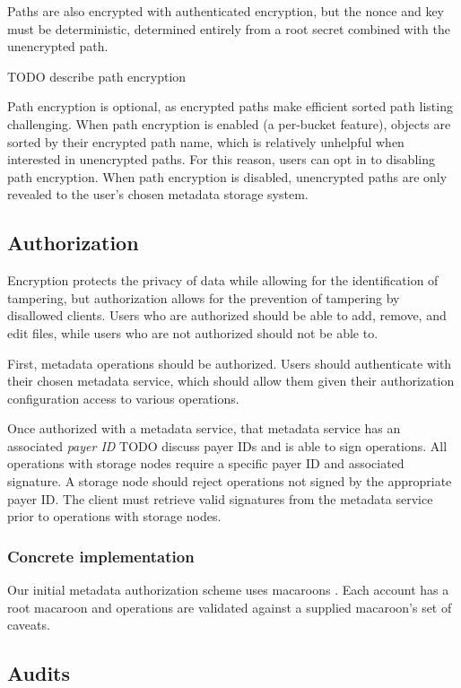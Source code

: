 \documentclass[a4paper,10pt]{article} \usepackage[utf8]{inputenc}
\newcommand{\todo}[1]{{\color{red} TODO #1}}
\begin{document}
Paths are also encrypted with authenticated encryption, but the nonce and key
must be deterministic, determined entirely from a root secret combined with the
unencrypted path.

\todo{describe path encryption}

Path encryption is optional, as encrypted paths make efficient sorted path
listing challenging. When path encryption is enabled (a per-bucket feature),
objects are sorted by their encrypted path name, which is relatively unhelpful
when interested in unencrypted paths. For this reason, users can opt in to
disabling path encryption. When path encryption is disabled, unencrypted paths
are only revealed to the user's chosen metadata storage system.

\subsection{Authorization}

Encryption protects the privacy of data while allowing for the identification
of tampering, but authorization allows for the prevention of tampering by
disallowed clients. Users who are authorized should be able to add, remove,
and edit files, while users who are not authorized should not be able to.

First, metadata operations should be authorized. Users should authenticate with
their chosen metadata service, which should allow them given their authorization
configuration access to various operations.

Once authorized with a metadata service, that metadata service has an associated
{\em payer ID} \todo{discuss payer IDs} and is able to sign operations. All
operations with storage nodes require a specific payer ID and associated
signature. A storage node should reject operations not signed by the appropriate
payer ID. The client must retrieve valid signatures from the metadata service
prior to operations with storage nodes.

\subsubsection{Concrete implementation}

Our initial metadata authorization scheme uses macaroons \cite{macaroons}.
Each account has a root macaroon and operations are validated against a supplied
macaroon's set of caveats.

\subsection{Audits}
\end{document}

